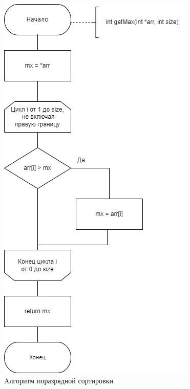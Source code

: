 \begin{figure}[h]
	\begin{center}
		\includegraphics[scale=0.7]{img/radix_sort_1.png}
	\end{center}
	\captionsetup{justification=centering}
	\caption{Aлгоритм поразрядной сортировки}
	\label{img:radix_sort_1}
\end{figure}
\clearpage
